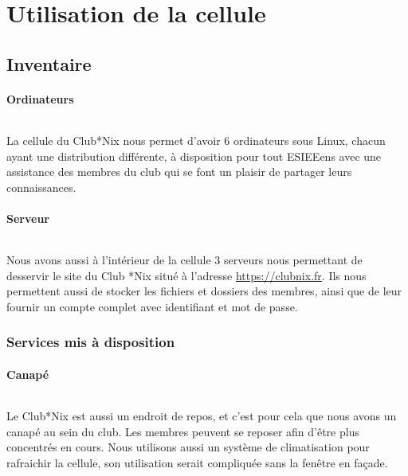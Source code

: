 \documentclass[11pt]{report}
\begin{document}
\part{Utilisation de la cellule}

\chapter{Inventaire}


\subsection{Ordinateurs}

\paragraph{} La cellule du Club*Nix nous permet d'avoir 6 ordinateurs sous
Linux, chacun ayant une distribution différente, à disposition pour tout
ESIEEens avec une assistance des membres du club qui se font un plaisir de
partager leurs connaissances.

\subsection{Serveur}

\paragraph{} Nous avons aussi à l'intérieur de la cellule 3 serveurs nous
permettant de desservir le site du Club *Nix situé à l'adresse
\url{https://clubnix.fr}. Ils nous permettent aussi de stocker les fichiers et
dossiers des membres, ainsi que de leur fournir un compte complet avec
identifiant et mot de passe.

\section{Services mis à disposition}

\subsection{Canapé}

\paragraph{} Le Club*Nix est aussi un endroit de repos, et c'est pour cela que
nous avons un canapé au sein du club. Les membres peuvent se reposer afin
d'être plus concentrés en cours. Nous utilisons aussi un système de
climatisation pour rafraichir la cellule, son utilisation serait compliquée
sans la fenêtre en façade.
\end{document}
